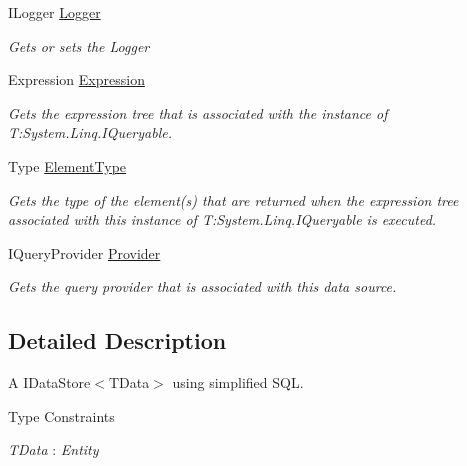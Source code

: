 \begin{DoxyCompactItemize}
I\+Logger \hyperlink{classCqrs_1_1DataStores_1_1SqlDataStore_a44cd63b587e42b278177070eab8404f7}{Logger}
\begin{DoxyCompactList}\small\item\em Gets or sets the Logger \end{DoxyCompactList}\item 
Expression \hyperlink{classCqrs_1_1DataStores_1_1SqlDataStore_a1fb28f14cf7762331ec9e7d5efe19c75}{Expression}
\begin{DoxyCompactList}\small\item\em Gets the expression tree that is associated with the instance of T\+:\+System.\+Linq.\+I\+Queryable. \end{DoxyCompactList}\item 
Type \hyperlink{classCqrs_1_1DataStores_1_1SqlDataStore_ab96bad4f637c7cfc95e97598c8753d02}{Element\+Type}
\begin{DoxyCompactList}\small\item\em Gets the type of the element(s) that are returned when the expression tree associated with this instance of T\+:\+System.\+Linq.\+I\+Queryable is executed. \end{DoxyCompactList}\item 
I\+Query\+Provider \hyperlink{classCqrs_1_1DataStores_1_1SqlDataStore_aec0093c6fe2adc41899c2418a0e324d9}{Provider}
\begin{DoxyCompactList}\small\item\em Gets the query provider that is associated with this data source. \end{DoxyCompactList}\end{DoxyCompactItemize}


\subsection{Detailed Description}
A I\+Data\+Store$<$\+T\+Data$>$ using simplified S\+QL. 

\begin{Desc}
\item[Type Constraints]\begin{description}
\item[{\em T\+Data} : {\em Entity}]\end{description}
\end{Desc}


